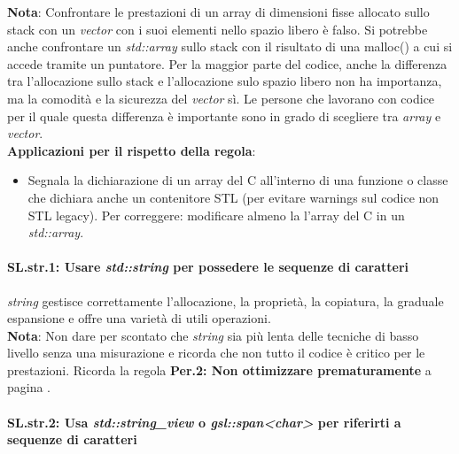 \textsf{\small \textbf{Nota}: Confrontare le prestazioni di un array di dimensioni fisse allocato sullo stack con un \emph{vector} con i suoi elementi nello spazio libero è falso. Si potrebbe anche confrontare un \emph{std::array} sullo stack con il risultato di una malloc() a cui si accede tramite un puntatore. Per la maggior parte del codice, anche la differenza tra l'allocazione sullo stack e l'allocazione sulo spazio libero non ha importanza, ma la comodità e la sicurezza del \emph{vector} sì. Le persone che lavorano con codice per il quale questa differenza è importante sono in grado di scegliere tra \emph{array} e \emph{vector}.} \\

\textsf{\small \textbf{Applicazioni per il rispetto della regola}: }

\begin{itemize}
	\item \textsf{\small Segnala la dichiarazione di un array del C all'interno di una funzione o classe che dichiara anche un contenitore STL (per evitare warnings sul codice non STL legacy). Per correggere: modificare almeno la l'array del C in un \emph{std::array}.}
\end{itemize}


\paragraph{SL.str.1: Usare \emph{std::string} per possedere le sequenze di caratteri}

\textsf{\small \emph{string} gestisce correttamente l'allocazione, la proprietà, la copiatura, la graduale espansione e offre una varietà di utili operazioni.} \\

\textsf{\small \textbf{Nota}: Non dare per scontato che \emph{string} sia più lenta delle tecniche di basso livello senza una misurazione e ricorda che non tutto il codice è critico per le prestazioni. Ricorda la regola \textbf{Per.2: Non ottimizzare prematuramente} a pagina \pageref{Per_2}.} \\

\paragraph{SL.str.2: Usa \emph{std::string\_view} o \emph{gsl::span<char>} per riferirti a sequenze di caratteri}

